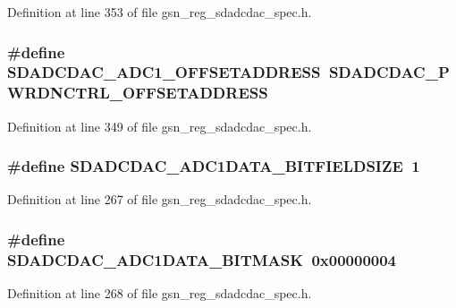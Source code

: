 Definition at line 353 of file gsn\_\-reg\_\-sdadcdac\_\-spec.h.

\hypertarget{a00569_a8880d5b91fc198538b07378f41c148cd}{
\subsubsection[{SDADCDAC\_\-ADC1\_\-OFFSETADDRESS}]{\setlength{\rightskip}{0pt plus 5cm}\#define SDADCDAC\_\-ADC1\_\-OFFSETADDRESS~SDADCDAC\_\-PWRDNCTRL\_\-OFFSETADDRESS}}
\label{a00569_a8880d5b91fc198538b07378f41c148cd}


Definition at line 349 of file gsn\_\-reg\_\-sdadcdac\_\-spec.h.

\hypertarget{a00569_a76bf3ceb5e9cd6b2878335a47b6858c2}{
\subsubsection[{SDADCDAC\_\-ADC1DATA\_\-BITFIELDSIZE}]{\setlength{\rightskip}{0pt plus 5cm}\#define SDADCDAC\_\-ADC1DATA\_\-BITFIELDSIZE~1}}
\label{a00569_a76bf3ceb5e9cd6b2878335a47b6858c2}


Definition at line 267 of file gsn\_\-reg\_\-sdadcdac\_\-spec.h.

\hypertarget{a00569_a8ec00c86675b46657edf34897a6c7034}{
\subsubsection[{SDADCDAC\_\-ADC1DATA\_\-BITMASK}]{\setlength{\rightskip}{0pt plus 5cm}\#define SDADCDAC\_\-ADC1DATA\_\-BITMASK~0x00000004}}
\label{a00569_a8ec00c86675b46657edf34897a6c7034}


Definition at line 268 of file gsn\_\-reg\_\-sdadcdac\_\-spec.h.

